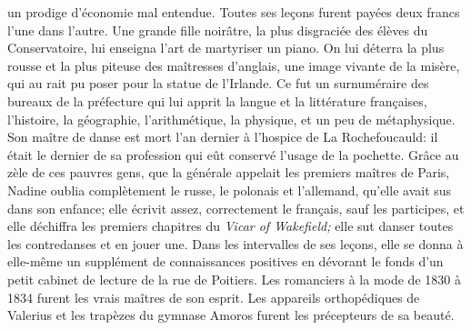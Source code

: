 un prodige d'économie mal entendue. Toutes ses leçons furent payées deux
francs l'une dans l'autre. Une grande fille noirâtre, la plus disgraciée
des élèves du Conservatoire, lui enseigna l'art de martyriser un piano.
On lui déterra la plus rousse et la plus piteuse des maîtresses
d'anglais, une image vivante de la misère, qui au rait pu poser pour la
statue de l'Irlande. Ce fut un surnuméraire des bureaux de la préfecture
qui lui apprit la langue et la littérature françaises, l'histoire, la
géographie, l'arithmétique, la physique, et un peu de métaphysique. Son
maître de danse est mort l'an dernier à l'hospice de La Rochefoucauld:
il était le dernier de sa profession qui eût conservé l'usage de la
pochette. Grâce au zèle de ces pauvres gens, que la générale appelait
les premiers maîtres de Paris, Nadine oublia complètement le russe, le
polonais et l'allemand, qu'elle avait sus dans son enfance; elle écrivit
assez, correctement le français, sauf les participes, et elle déchiffra
les premiers chapitres du \emph{Vicar of Wakefield;} elle sut danser
toutes les contredanses et en jouer une. Dans les intervalles de ses
leçons, elle se donna à elle-même un supplément de connaissances
positives en dévorant le fonds d'un petit cabinet de lecture de la rue
de Poitiers. Les romanciers à la mode de 1830 à 1834 furent les vrais
maîtres de son esprit. Les appareils orthopédiques de Valerius et les
trapèzes du gymnase Amoros furent les précepteurs de sa beauté.

